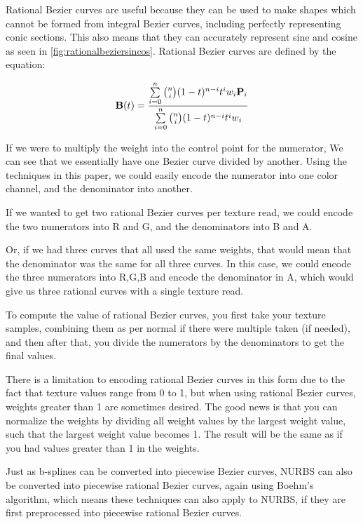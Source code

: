 \documentclass{jcgt}
\begin{document}
Rational Bezier curves are useful because they can be used to make shapes which cannot be formed from integral Bezier curves, including perfectly representing conic sections.  This also means that they can accurately represent sine and cosine as seen in \autoref{fig:rationalbeziersincos}.  Rational Bezier curves are defined by the equation:

\begin{equation}
\text{\bf{B}}(t) = \frac
                {\sum\limits_{i=0}^n\binom {n} {i}(1-t)^{n-i}t^iw_i\text{\bf{P}}_i}
                {\sum\limits_{i=0}^n\binom {n} {i}(1-t)^{n-i}t^iw_i}
\label{eqn:rationalbezier}                
\end{equation}

If we were to multiply the weight into the control point for the numerator, We can see that we essentially have one Bezier curve divided by another.  Using the techniques in this paper, we could easily encode the numerator into one color channel, and the denominator into another.

If we wanted to get two rational Bezier curves per texture read, we could encode the two numerators into R and G, and the denominators into B and A.

Or, if we had three curves that all used the same weights, that would mean that the denominator was the same for all three curves.  In this case, we could encode the three numerators into R,G,B and encode the denominator in A, which would give us three rational curves with a single texture read.

To compute the value of rational Bezier curves, you first take your texture samples, combining them as per normal if there were multiple taken (if needed), and then after that, you divide the numerators by the denominators to get the final values.

There is a limitation to encoding rational Bezier curves in this form due to the fact that texture values range from 0 to 1, but when using rational Bezier curves, weights greater than 1 are sometimes desired.  The good news is that you can normalize the weights by dividing all weight values by the largest weight value, such that the largest weight value becomes 1.  The result will be the same as if you had values greater than 1 in the weights.

Just as b-splines can be converted into piecewise Bezier curves, NURBS can also be converted into piecewise rational Bezier curves, again using Boehm's algorithm, which means these techniques can also apply to NURBS, if they are first preprocessed into piecewise rational Bezier curves.
\end{document}
